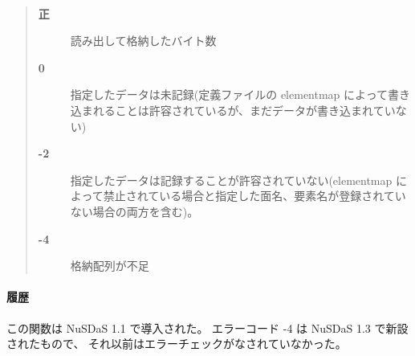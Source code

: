 \paragraph{\ResultCode}
\begin{quote}
\begin{description}
\item[{\bf 正}] 読み出して格納したバイト数
\item[{\bf 0}] 指定したデータは未記録(定義ファイルの elementmap によって書き込まれることは許容されているが、まだデータが書き込まれていない)
\item[{\bf -2}] 指定したデータは記録することが許容されていない(elementmap によって禁止されている場合と指定した面名、要素名が登録されていない場合の両方を含む)。
\item[{\bf -4}] 格納配列が不足
\end{description}\end{quote}

\paragraph{履歴}
この関数は NuSDaS 1.1 で導入された。
エラーコード -4 は NuSDaS 1.3 で新設されたもので、
それ以前はエラーチェックがなされていなかった。
